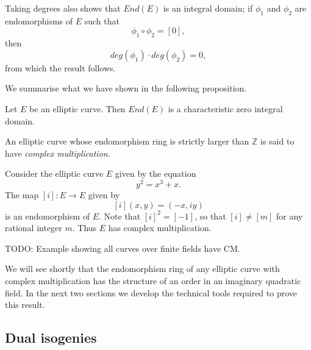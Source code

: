 Taking degrees also shows that $End(E)$ is an integral domain; if $\phi_{1}$ and
$\phi_{2}$ are endomorphisms of $E$ such that
\begin{equation*}
  \phi_{1} \circ \phi_{2} = \left[0\right],
\end{equation*}
then
\begin{equation*}
  deg \left( \phi_{1} \right) \cdot deg \left( \phi_{2} \right) = 0,
\end{equation*}
from which the result follows.

We summarise what we have shown in the following proposition.

\begin{prop}
  \label{prop:End(E)-is-char-zero-id}
  Let $E$ be an elliptic curve.  Then $End(E)$ is a characteristic zero integral
  domain.
\end{prop}

An elliptic curve whose endomorphism ring is strictly larger than $\mathbb{Z}$ is
said to have \emph{complex multiplication}.

\begin{example}
  \label{ex:cm-example}
  Consider the elliptic curve $E$ given by the equation
  \begin{equation*}
    y^{2} = x^{3} + x.
  \end{equation*}
  The map $\left[ i \right] \colon E \rightarrow E$ given by
  \begin{equation*}
    \left[ i \right](x,y) = (-x,iy)
  \end{equation*}
  is an endomorphism of $E$.  Note that $\left[ i \right]^{2} = \left[ -1 \right]$,
  so that $\left[ i \right] \neq \left[ m \right]$ for any rational integer $m$.
  Thus $E$ has complex multiplication.
\end{example}

\begin{example}
  \label{ex:finite-field-cm}
  TODO: Example showing all curves over finite fields have CM.
\end{example}

We will see shortly that the endomorphism ring of any elliptic curve with complex
multiplication has the structure of an order in an imaginary quadratic field.  In the
next two sections we develop the technical tools required to prove this result.

\subsection{Dual isogenies}
\label{sec:an-interlude-dual}

